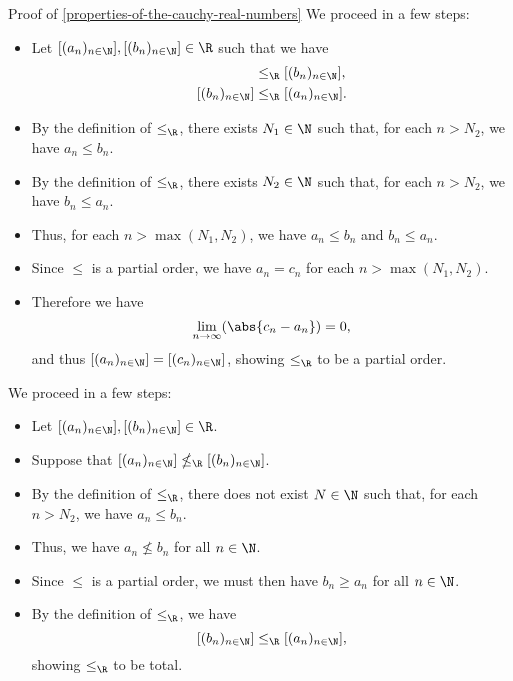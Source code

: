 \begin{Proof}{Proof of \cref{properties-of-the-cauchy-real-numbers}}
    We proceed in a few steps:
    \begin{itemize}
        \item Let $[(a_{n})_{n\in\N}],[(b_{n})_{n\in\N}]\in\R$ such that we have
            \begin{align*}
                [(a_{n})_{n\in\N}] &\leq_{\R} [(b_{n})_{n\in\N}],\\
                [(b_{n})_{n\in\N}] &\leq_{\R} [(a_{n})_{n\in\N}].
            \end{align*}
        \item By the definition of $\leq_{\R}$, there exists $N_{1}\in\N$ such that, for each $n\gt N_{2}$, we have $a_{n}\leq b_{n}$.
        \item By the definition of $\leq_{\R}$, there exists $N_{2}\in\N$ such that, for each $n\gt N_{2}$, we have $b_{n}\leq a_{n}$.
        \item Thus, for each $n\gt\max(N_{1},N_{2})$, we have $a_{n}\leq b_{n}$ and $b_{n}\leq a_{n}$.
        \item Since $\leq$ is a partial order, we have $a_{n}=c_{n}$ for each $n\gt\max(N_{1},N_{2})$.
        \item Therefore we have
            \[
                \lim_{n\to\infty}(\abs{c_{n}-a_{n}})%
                =%
                0,%
            \]%
            and thus $[(a_{n})_{n\in\N}]=[(c_{n})_{n\in\N}]$, showing $\leq_{\R}$ to be a partial order.
    \end{itemize}

    We proceed in a few steps:
    \begin{itemize}
        \item Let $[(a_{n})_{n\in\N}],[(b_{n})_{n\in\N}]\in\R$.
        \item Suppose that $[(a_{n})_{n\in\N}]\nleq_{\R}[(b_{n})_{n\in\N}]$.
        \item By the definition of $\leq_{\R}$, there does not exist $N\in\N$ such that, for each $n\gt N_{2}$, we have $a_{n}\leq b_{n}$.
        \item Thus, we have $a_{n}\nleq b_{n}$ for all $n\in\N$.
        \item Since $\leq$ is a partial order, we must then have $b_{n}\geq a_{n}$ for all $n\in\N$.
        \item By the definition of $\leq_{\R}$, we have
            \[
                [(b_{n})_{n\in\N}]%
                \leq_{\R}%
                [(a_{n})_{n\in\N}],%
            \]%
            showing $\leq_{\R}$ to be total.
    \end{itemize}


\end{Proof}
